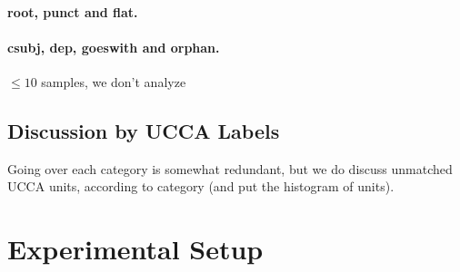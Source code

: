 \documentclass[11pt,a4paper]{article}
\begin{document}
\paragraph{root, punct and flat.}

\paragraph{csubj, dep, goeswith and orphan.}
$\leq 10$ samples, we don't analyze


\subsection{Discussion by UCCA Labels}

Going over each category is somewhat redundant, but we do discuss unmatched UCCA units, according to category (and put the histogram of units).


\section{Experimental Setup}\label{sec:experiments}
\end{document}
